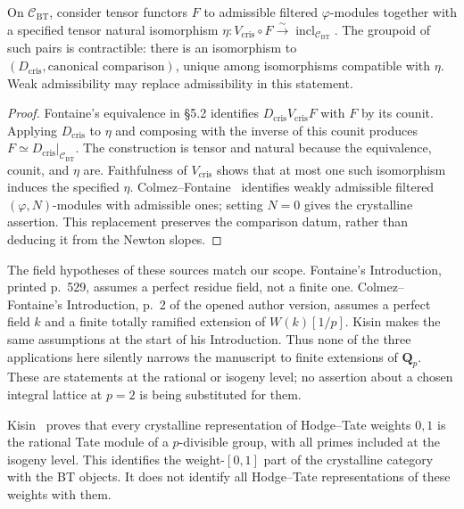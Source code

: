 \begin{proposition}\label{cat:J6}
On $\mathcal C_{\mathrm{BT}}$, consider tensor functors $F$ to
admissible filtered $\varphi$-modules together with a specified tensor
natural isomorphism
$\eta:V_{\mathrm{cris}}\circ F\xrightarrow{\sim}
\operatorname{incl}_{\mathcal C_{\mathrm{BT}}}$.
The groupoid of such pairs is contractible: there is an isomorphism
to $(D_{\mathrm{cris}},\text{canonical comparison})$, unique among
isomorphisms compatible with $\eta$.  Weak admissibility may replace
admissibility in this statement.
\end{proposition}
\begin{proof}
Fontaine's equivalence in \S5.2 identifies
$D_{\mathrm{cris}}V_{\mathrm{cris}}F$ with $F$ by its counit.
Applying $D_{\mathrm{cris}}$ to $\eta$ and composing with the inverse
of this counit produces $F\simeq D_{\mathrm{cris}}|_{\mathcal C_{\mathrm{BT}}}$.
The construction is tensor and natural because the equivalence, counit,
and $\eta$ are.  Faithfulness of $V_{\mathrm{cris}}$ shows that at most
one such isomorphism induces the specified $\eta$.
Colmez--Fontaine~\cite[Theorem A; \S4.1, Theorem 4.3 and its
corollary]{catColmezFontaine2000} identifies weakly admissible
filtered $(\varphi,N)$-modules with admissible ones; setting $N=0$
gives the crystalline assertion.  This replacement preserves the
comparison datum, rather than deducing it from the Newton slopes.
\end{proof}

The field hypotheses of these sources match our scope.  Fontaine's
Introduction, printed p.~529, assumes a perfect residue field, not a
finite one.  Colmez--Fontaine's Introduction, p.~2 of the opened author
version, assumes a perfect field $k$ and a finite totally ramified
extension of $W(k)[1/p]$.  Kisin makes the same assumptions at the
start of his Introduction.  Thus none of the three applications here
silently narrows the manuscript to finite extensions of $\mathbf Q_p$.
These are statements at the rational or isogeny level; no assertion
about a chosen integral lattice at $p=2$ is being substituted for them.

Kisin~\cite[Theorem (0.3), Corollary (2.2.6)]{catKisin2006} proves
that every crystalline representation of Hodge--Tate weights $0,1$
is the rational Tate module of a $p$-divisible group, with all primes
included at the isogeny level.  This identifies the weight-$[0,1]$
part of the crystalline category with the BT objects.  It does not
identify all Hodge--Tate representations of these weights with them.


